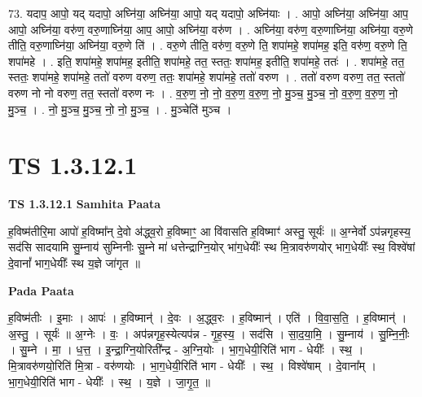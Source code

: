 \documentclass[17pt]{extarticle}
\begin{document}
73. यदाप॒ आपो॒ यद् यदापो॒ अघ्नि॑या॒ अघ्नि॑या॒ आपो॒ यद् यदापो॒ अघ्नि॑याः । . आपो॒ अघ्नि॑या॒ अघ्नि॑या॒ आप॒ आपो॒ अघ्नि॑या॒ वरु॑ण॒ वरु॒णाघ्नि॑या॒ आप॒ आपो॒ अघ्नि॑या॒ वरु॑ण । . अघ्नि॑या॒ वरु॑ण॒ वरु॒णाघ्नि॑या॒ अघ्नि॑या॒ वरु॒णे तीति॒ वरु॒णाघ्नि॑या॒ अघ्नि॑या॒ वरु॒णे ति॑ । . वरु॒णे तीति॒ वरु॑ण॒ वरु॒णे ति॒ शपा॑महे॒ शपा॑मह॒ इति॒ वरु॑ण॒ वरु॒णे ति॒ शपा॑महे । . इति॒ शपा॑महे॒ शपा॑मह॒ इतीति॒ शपा॑महे॒ तत॒ स्ततः॒ शपा॑मह॒ इतीति॒ शपा॑महे॒ ततः॑ । . शपा॑महे॒ तत॒ स्ततः॒ शपा॑महे॒ शपा॑महे॒ ततो॑ वरुण वरुण॒ ततः॒ शपा॑महे॒ शपा॑महे॒ ततो॑ वरुण । . ततो॑ वरुण वरुण॒ तत॒ स्ततो॑ वरुण नो नो वरुण॒ तत॒ स्ततो॑ वरुण नः । . व॒रु॒ण॒ नो॒ नो॒ व॒रु॒ण॒ व॒रु॒ण॒ नो॒ मु॒ञ्च॒ मु॒ञ्च॒ नो॒ व॒रु॒ण॒ व॒रु॒ण॒ नो॒ मु॒ञ्च॒ । . नो॒ मु॒ञ्च॒ मु॒ञ्च॒ नो॒ नो॒ मु॒ञ्च॒ । . मु॒ञ्चेति॑ मुञ्च । \newline
\pagebreak
{}
\section*{ TS 1.3.12.1 }

\textbf{TS 1.3.12.1 } \newline
\textbf{Samhita Paata} \newline

ह॒विष्म॑तीरि॒मा आपो॑ ह॒विष्मा᳚न् दे॒वो अ॑द्ध्व॒रो ह॒विष्माꣳ॒॒ आ वि॑वासति ह॒विष्माꣳ॑ अस्तु॒ सूर्यः॑ ॥ अ॒ग्नेर्वो ऽप॑न्नगृहस्य॒ सद॑सि सादयामि सु॒म्नाय॑ सुम्निनीः सु॒म्ने मा॑ धत्तेन्द्राग्नि॒योर् भा॑ग॒धेयीः᳚ स्थ मि॒त्रावरु॑णयोर् भाग॒धेयीः᳚ स्थ॒ विश्वे॑षां दे॒वानां᳚ भाग॒धेयीः᳚ स्थ य॒ज्ञे जा॑गृत ॥ \newline

\textbf{Pada Paata} \newline

ह॒विष्म॑तीः । इ॒माः । आपः॑ । ह॒विष्मान्॑ । दे॒वः । अ॒द्ध्व॒रः । ह॒विष्मान्॑ । एति॑ । वि॒वा॒स॒ति॒ । ह॒विष्मान्॑ । अ॒स्तु॒ । सूर्यः॑ ॥ अ॒ग्नेः । वः॒ । अप॑न्नगृह॒स्येत्यप॑न्न - गृ॒ह॒स्य॒ । सद॑सि । सा॒द॒या॒मि॒ । सु॒म्नाय॑ । सु॒म्नि॒नीः॒ । सु॒म्ने । मा॒ । ध॒त्त॒ । इ॒न्द्रा॒ग्नि॒योरिती᳚न्द्र - अ॒ग्नि॒योः । भा॒ग॒धेयी॒रिति॑ भाग - धेयीः᳚ । स्थ॒ । मि॒त्रावरु॑णयो॒रिति॑ मि॒त्रा - वरु॑णयोः । भा॒ग॒धेयी॒रिति॑ भाग - धेयीः᳚ । स्थ॒ । विश्वे॑षाम् । दे॒वाना᳚म् । भा॒ग॒धेयी॒रिति॑ भाग - धेयीः᳚ । स्थ॒ । य॒ज्ञे । जा॒गृ॒त॒ ॥  \newline
\end{document}
